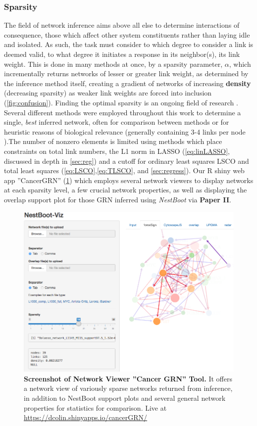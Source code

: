 \subsubsection{Sparsity}
\label{sec:spar}
The field of network inference aims above all else to determine interactions of consequence, those which affect other system constituents rather than laying idle and isolated. As such, the task must consider to which degree to consider a link is deemed valid, to what degree it initiates a response in its neighbor(s), \ie its link weight. This is done in many methods at once, by a sparsity parameter, $\alpha$, which incrementally returns networks of lesser or greater link weight, as determined by the inference method itself, creating a gradient of networks of increasing \textbf{density} (decreasing sparsity) as weaker link weights are forced into inclusion (\cref{fig:confusion}). Finding the optimal sparsity is an ongoing field of research \citep{tjarnberg2013optimal}. Several different methods were employed throughout this work to determine a single, \emph{best} inferred network, often for comparison between methods or for heuristic reasons of biological relevance (\ie generally containing 3-4 links per node \citep{tjarnberg2013optimal}).The number of nonzero elements is limited using methods which place constraints on total link numbers, \eg the L1 norm in LASSO (\cref{eq:linLASSO}, discussed in depth in \cref{sec:reg}) and a cutoff for ordinary least squares LSCO and total least squares (\cref{eq:LSCO},\cref{eq:TLSCO}, and \cref{sec:regress}). Our R shiny web app ''CancerGRN'' (\cref{fig:GSweb}) which employs several network viewers to display networks at each sparsity level, a few crucial network properties, as well as displaying the overlap support plot for those GRN inferred using \emph{NestBoot} via \textbf{Paper II}.


\begin{figure}
\centering
\includegraphics[width=1\linewidth]{4/NestBoot-Viz2.png}
\caption{\textbf{Screenshot of Network Viewer ''Cancer GRN'' Tool.} It offers a network view of variously sparse networks returned from inference, in addition to NestBoot support plots and several general network properties for statistics for comparison. Live at \url{https://dcolin.shinyapps.io/cancerGRN/}}
\label{fig:GSweb}
\end{figure}

